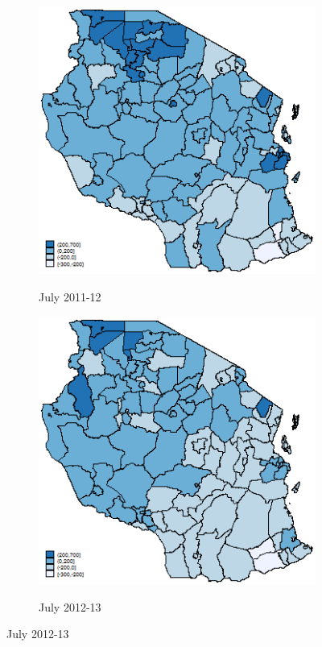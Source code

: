 \begin{figure}[h]
\begin{subfigure}[h]{0.45\textwidth}
\end{subfigure}
\begin{subfigure}[h]{0.45\textwidth}
\caption{July 2011-12}
\includegraphics[width=\textwidth,trim= 0cm 0cm 0cm 0cm, clip=true, keepaspectratio]{11_dev_district} \label{rain11}
\end{subfigure}
\begin{subfigure}[h]{0.45\textwidth}
\caption{July 2012-13}
\includegraphics[width=\textwidth,trim= 0cm 0cm 0cm 0cm, clip=true, keepaspectratio]{12_dev_district} \label{rain12}
\end{subfigure}
\end{figure}
\clearpage